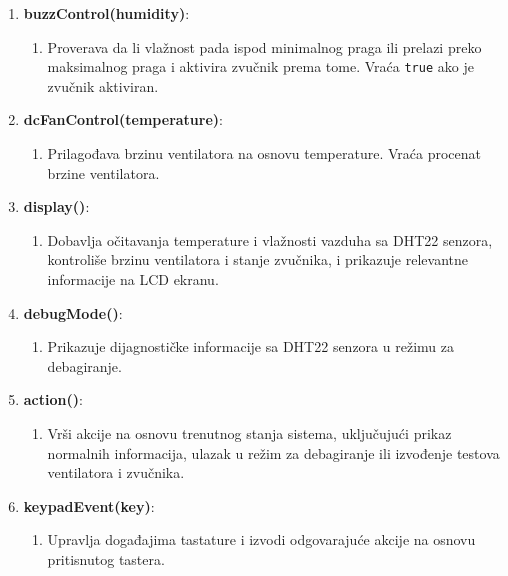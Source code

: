 \documentclass[a4paper, 12pt]{article}
\begin{document}
\begin{enumerate}[label=\arabic*.,leftmargin=*]
    \item \textbf{buzzControl(humidity)}:
        \begin{enumerate}[label={},leftmargin=*]
            \item Proverava da li vlažnost pada ispod minimalnog praga ili prelazi preko maksimalnog praga i aktivira zvučnik prema tome. Vraća \texttt{true} ako je zvučnik aktiviran.
        \end{enumerate}
        
    \item \textbf{dcFanControl(temperature)}:
        \begin{enumerate}[label={},leftmargin=*] 
            \item Prilagođava brzinu ventilatora na osnovu temperature. Vraća procenat brzine ventilatora.
        \end{enumerate}
        
    \item \textbf{display()}:
        \begin{enumerate}[label={},leftmargin=*]
            \item Dobavlja očitavanja temperature i vlažnosti vazduha sa DHT22 senzora, kontroliše brzinu ventilatora i stanje zvučnika, i prikazuje relevantne informacije na LCD ekranu.
        \end{enumerate}
        
    \item \textbf{debugMode()}:
        \begin{enumerate}[label={},leftmargin=*] 
            \item Prikazuje dijagnostičke informacije sa DHT22 senzora u režimu za debagiranje.
        \end{enumerate}
        
    \item \textbf{action()}:
        \begin{enumerate}[label={},leftmargin=*] 
            \item Vrši akcije na osnovu trenutnog stanja sistema, uključujući prikaz normalnih informacija, ulazak u režim za debagiranje ili izvođenje testova ventilatora i zvučnika.
        \end{enumerate}
        
    \item \textbf{keypadEvent(key)}:
        \begin{enumerate}[label={},leftmargin=*] 
            \item Upravlja događajima tastature i izvodi odgovarajuće akcije na osnovu pritisnutog tastera.
        \end{enumerate}
        

\end{enumerate}
\end{document}
